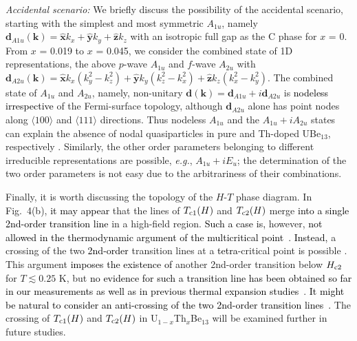 \documentclass[twocolumn, prl]{revtex4}%
\newcommand{\correct}[1]{\textcolor{black}{#1}}
\begin{document}
 



\textit{Accidental  scenario: } 
We  briefly discuss the possibility of the accidental scenario, starting with   
 the simplest and most symmetric  $A_{1u}$,  namely $\bm{d}_{A1u} (\bm{k} ) =\hat{\bm {x} } k_{x} +\hat{\bm {y} } k_{y} +\hat{\bm {z} } k_{z} $ with an isotropic full gap  as the C phase for $x$ = 0.
From $x$ = 0.019 to $x$ = 0.045, we consider the combined state of 
 1D representations, the above  $p$-wave  $A_{1u}$ and $f$-wave $A_{2u}$ with  $\bm{d}_{A2u} (\bm{k} ) =\hat{\bm {x} } k_{x} (k_{y}^2 - k_{z}^2)  + \hat{\bm {y} } k_{y} (k_{z}^2 - k_{x}^2 ) + \hat{\bm {z} } k_{z} (k_{x}^2 - k_{y}^2) $.
The combined state  of  $A_{1u}$ and $A_{2u}$, namely,  non-unitary $ \bm{d} (\bm{k}) = \bm{d}_{A1u} + i \bm{d}_{A2u}$ is \correct{nodeless irrespective}  of the Fermi-surface topology, although  $\bm{d}_{A2u} $  alone  has point nodes  along  $\langle100\rangle$ and   $\langle111\rangle$ directions.
Thus nodeless $A_{1u}$ and the  $A_{1u} + iA_{2u}$ states  can explain the 
  absence of nodal quasiparticles in  pure and Th-doped UBe$_{13}$, respectively
 \cite{Endnote_isotropic_A1g}.
Similarly, the other order parameters belonging to different irreducible representations are possible, \textit{e.g.}, $A_{1u} + i E_{u}$;
  the determination of the two order parameters is not easy due to the arbitrariness of their combinations.



Finally,  it is worth  discussing  the topology of the $H$-$T$ phase diagram.
In Fig.~4(b),  \correct{it may appear} that  the lines of $T_{\rm c1}(H)$ and $T_{\rm c2}(H)$
 merge \correct{into a single 2nd-order transition line} in a high-field region.
\correct{Such a case is,}  however, \correct{not allowed in the thermodynamic argument of the multicritical point~\cite{Yip91PRB,Endnote_1stOrderPhaseTransition}}.
\correct{Instead,}  a crossing of the two  \correct{2nd-order} transition lines at a \correct{tetra}-critical point is possible
 \cite{Yip91PRB}.
This argument \correct{imposes the existence of} another  2nd-order transition  below $H_{\rm c2}$
 for $T \lesssim 0.25$ K, but \correct{no evidence for such a transition line has  been obtained so far in our measurements as well as in previous thermal expansion studies~\cite{Kromer_PRL_1998}}. 
\correct{It might be natural to consider an anti-crossing of the two 2nd-order transition lines~\cite{Machida_JPSJ_1989}.}
The crossing of $T_{\rm c1}(H)$ and $T_{\rm c2}(H)$ in U$_{1-x}$Th$_{x}$Be$_{13}$  will be examined further in future studies. 
\end{document}
